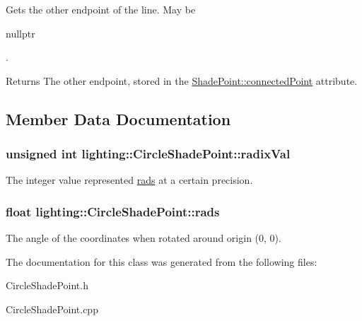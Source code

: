 Gets the other endpoint of the line. May be 
\begin{DoxyCode}
\textcolor{keyword}{nullptr}
\end{DoxyCode}
. 

\begin{DoxyReturn}{Returns}
The other endpoint, stored in the \hyperlink{classlighting_1_1ShadePoint_a0840495febcd385a90e89e003aa15972}{Shade\+Point\+::connected\+Point} attribute.
\end{DoxyReturn}


\subsection{Member Data Documentation}
\subsubsection[{\texorpdfstring{radix\+Val}{radixVal}}]{\setlength{\rightskip}{0pt plus 5cm}unsigned int lighting\+::\+Circle\+Shade\+Point\+::radix\+Val}\hypertarget{classlighting_1_1CircleShadePoint_a3a48629b0aebab194ab7d139d496c2da}{}\label{classlighting_1_1CircleShadePoint_a3a48629b0aebab194ab7d139d496c2da}


The integer value represented \hyperlink{classlighting_1_1CircleShadePoint_a4b174fb379fd8d03ba4a5c47877b38ac}{rads} at a certain precision. 

\subsubsection[{\texorpdfstring{rads}{rads}}]{\setlength{\rightskip}{0pt plus 5cm}float lighting\+::\+Circle\+Shade\+Point\+::rads}\hypertarget{classlighting_1_1CircleShadePoint_a4b174fb379fd8d03ba4a5c47877b38ac}{}\label{classlighting_1_1CircleShadePoint_a4b174fb379fd8d03ba4a5c47877b38ac}


The angle of the coordinates when rotated around origin (0, 0). 



The documentation for this class was generated from the following files\+:\begin{DoxyCompactItemize}
\item 
Circle\+Shade\+Point.\+h\item 
Circle\+Shade\+Point.\+cpp\end{DoxyCompactItemize}
